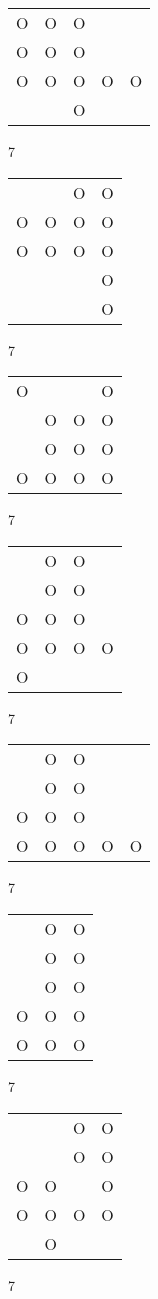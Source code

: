 \begin{tabular}{|m{0.2cm}m{0.2cm}m{0.2cm}m{0.2cm}m{0.2cm}|}\hline
O&O&O& & \\
O&O&O& & \\
O&O&O&O&O\\
 & &O& & \\
\hline\end{tabular}7
\begin{tabular}{|m{0.2cm}m{0.2cm}m{0.2cm}m{0.2cm}|}\hline
 & &O&O\\
O&O&O&O\\
O&O&O&O\\
 & & &O\\
 & & &O\\
\hline\end{tabular}7
\begin{tabular}{|m{0.2cm}m{0.2cm}m{0.2cm}m{0.2cm}|}\hline
O& & &O\\
 &O&O&O\\
 &O&O&O\\
O&O&O&O\\
\hline\end{tabular}7
\begin{tabular}{|m{0.2cm}m{0.2cm}m{0.2cm}m{0.2cm}|}\hline
 &O&O& \\
 &O&O& \\
O&O&O& \\
O&O&O&O\\
O& & & \\
\hline\end{tabular}7
\begin{tabular}{|m{0.2cm}m{0.2cm}m{0.2cm}m{0.2cm}m{0.2cm}|}\hline
 &O&O& & \\
 &O&O& & \\
O&O&O& & \\
O&O&O&O&O\\
\hline\end{tabular}7
\begin{tabular}{|m{0.2cm}m{0.2cm}m{0.2cm}|}\hline
 &O&O\\
 &O&O\\
 &O&O\\
O&O&O\\
O&O&O\\
\hline\end{tabular}7
\begin{tabular}{|m{0.2cm}m{0.2cm}m{0.2cm}m{0.2cm}|}\hline
 & &O&O\\
 & &O&O\\
O&O& &O\\
O&O&O&O\\
 &O& & \\
\hline\end{tabular}7

